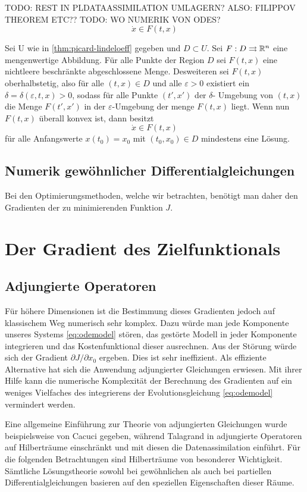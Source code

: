 TODO: REST IN PLDATAASSIMILATION UMLAGERN? ALSO: FILIPPOV THEOREM ETC??
TODO: WO NUMERIK VON ODES?
\[
 \dot x \in F(t,x)
\]
\cite{filippov1971existence}
\begin{theorem}[Filippov]
 Sei U wie in \ref{thm:picard-lindeloeff} gegeben und $D\subset U$. Sei $F:D\rightrightarrows \mathbb{R}^n$ eine mengenwertige Abbildung. Für alle Punkte der Region $D$ sei $F(t,x)$ eine nichtleere beschränkte abgeschlossene Menge. Desweiteren sei $F(t,x)$ oberhalbstetig, also für alle $(t,x)\in D$ und alle $\varepsilon>0$ existiert ein $\delta = \delta(\varepsilon,t,x)>0$, sodass für alle Punkte $(t',x')$ der $\delta$- Umgebung von $(t,x)$ die Menge $F(t',x')$ in der $\varepsilon$-Umgebung der menge $F(t,x)$ liegt.
 Wenn nun $F(t,x)$ überall konvex ist, dann besitzt  
 \[
  \dot x \in F(t,x)
 \]
 für alle Anfangswerte $x(t_0)=x_0$ mit $(t_0,x_0)\in D$ mindestens eine Lösung.
\end{theorem}


\subsection{Numerik gewöhnlicher Differentialgleichungen}
Bei den Optimierungsmethoden, welche wir betrachten, benötigt man daher den Gradienten der zu minimierenden Funktion $J$.

\section{Der Gradient des Zielfunktionals}
\subsection{Adjungierte Operatoren}
Für höhere Dimensionen ist die Bestimmung dieses Gradienten jedoch auf klassischem Weg numerisch sehr komplex. Dazu würde man jede Komponente unseres Systems \eqref{eq:odemodel} stören, das gestörte Modell in jeder Komponente integrieren und das Kostenfunktional dieser ausrechnen. Aus der Störung würde sich der Gradient $\partial J/\partial x_0$ ergeben. Dies ist sehr ineffizient. Als effiziente Alternative hat sich die Anwendung adjungierter Gleichungen erwiesen. Mit ihrer Hilfe kann die numerische Komplexität der Berechnung des Gradienten auf ein weniges Vielfaches des integrierens der Evolutionsgleichung \eqref{eq:odemodel} vermindert werden.

Eine allgemeine Einführung zur Theorie von adjungierten Gleichungen wurde beispielsweise von Cacuci \cite{cacuci1981sensitivity} gegeben, während Talagrand in \cite{talagrand1987variational} adjungierte Operatoren auf Hilberträume einschränkt und mit diesen die Datenassimilation einführt.
Für die folgenden Betrachtungen sind Hilberträume von besonderer Wichtigkeit. Sämtliche Lösungstheorie sowohl bei gewöhnlichen als auch bei partiellen Differentialgleichungen basieren auf den speziellen Eigenschaften dieser Räume.

